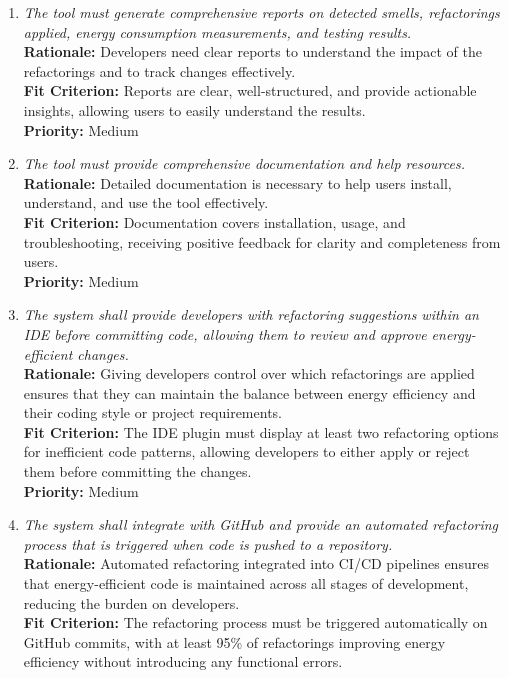 \documentclass[12pt]{article}
\begin{document}
\begin{enumerate}[label=FR \arabic*., wide=0pt, leftmargin=*]
    {\bf Priority:} Medium
    \item \emph{The tool must generate comprehensive reports on detected smells, refactorings applied, energy consumption measurements, and testing results.}\\
    {\bf Rationale:} Developers need clear reports to understand the impact of the refactorings and to track changes effectively.\\
    {\bf Fit Criterion:} Reports are clear, well-structured, and provide actionable insights, allowing users to easily understand the results.\\
    {\bf Priority:} Medium
    \item \emph{The tool must provide comprehensive documentation and help resources.}\\
    {\bf Rationale:} Detailed documentation is necessary to help users install, understand, and use the tool effectively.\\
    {\bf Fit Criterion:} Documentation covers installation, usage, and troubleshooting, receiving positive feedback for clarity and completeness from users.\\
    {\bf Priority:} Medium
    \item \emph{The system shall provide developers with refactoring suggestions within an IDE before committing code, allowing them to review and approve energy-efficient changes.}\\
    {\bf Rationale:} Giving developers control over which refactorings are applied ensures that they can maintain the balance between energy efficiency and their coding style or project requirements.\\
    {\bf Fit Criterion:} The IDE plugin must display at least two refactoring options for inefficient code patterns, allowing developers to either apply or reject them before committing the changes.\\
    {\bf Priority:} Medium
    \item \emph{The system shall integrate with GitHub and provide an automated refactoring process that is triggered when code is pushed to a repository.}\\
    {\bf Rationale:} Automated refactoring integrated into CI/CD pipelines ensures that energy-efficient code is maintained across all stages of development, reducing the burden on developers.\\
    {\bf Fit Criterion:} The refactoring process must be triggered automatically on GitHub commits, with at least 95\% of refactorings improving energy efficiency without introducing any functional errors.\\

\end{enumerate}
\end{document}
